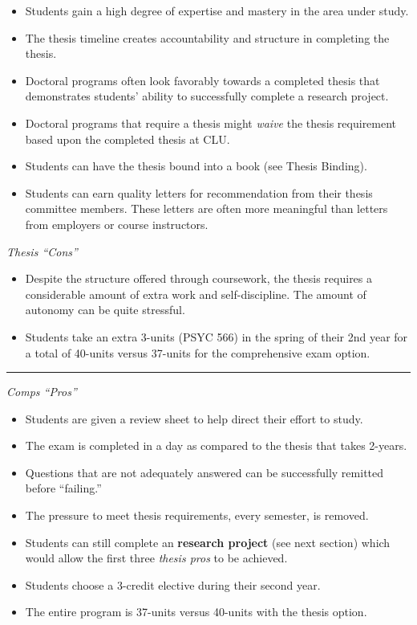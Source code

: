 \documentclass[openany]{book}
\providecommand{\tightlist}{%
  \setlength{\itemsep}{0pt}\setlength{\parskip}{0pt}}
\begin{document}
\begin{itemize}
\tightlist
\item
  Students gain a high degree of expertise and mastery in the area under study.
\item
  The thesis timeline creates accountability and structure in completing the thesis.
\item
  Doctoral programs often look favorably towards a completed thesis that demonstrates students' ability to successfully complete a research project.
\item
  Doctoral programs that require a thesis might \emph{waive} the thesis requirement based upon the completed thesis at CLU.
\item
  Students can have the thesis bound into a book (see Thesis Binding).
\item
  Students can earn quality letters for recommendation from their thesis committee members. These letters are often more meaningful than letters from employers or course instructors.
\end{itemize}

\emph{Thesis ``Cons''}

\begin{itemize}
\tightlist
\item
  Despite the structure offered through coursework, the thesis requires a considerable amount of extra work and self-discipline. The amount of autonomy can be quite stressful.
\item
  Students take an extra 3-units (PSYC 566) in the spring of their 2nd year for a total of 40-units versus 37-units for the comprehensive exam option.
\end{itemize}

\begin{center}\rule{0.5\linewidth}{0.5pt}\end{center}

\emph{Comps ``Pros''}

\begin{itemize}
\tightlist
\item
  Students are given a review sheet to help direct their effort to study.
\item
  The exam is completed in a day as compared to the thesis that takes 2-years.
\item
  Questions that are not adequately answered can be successfully remitted before ``failing.''
\item
  The pressure to meet thesis requirements, every semester, is removed.
\item
  Students can still complete an \textbf{research project} (see next section) which would allow the first three \emph{thesis pros} to be achieved.
\item
  Students choose a 3-credit elective during their second year.
\item
  The entire program is 37-units versus 40-units with the thesis option.
\end{itemize}
\end{document}

